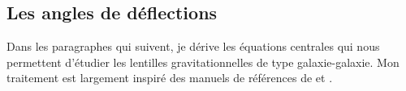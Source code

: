 





\subsection{Les angles de déflections}
Dans les paragraphes qui suivent, je dérive les équations centrales qui nous permettent 
d'étudier les lentilles gravitationnelles de type galaxie-galaxie.
Mon traitement est largement inspiré 
des manuels de références de \citet{Meneghetti2013} et 
\citet{Carroll2003}.

